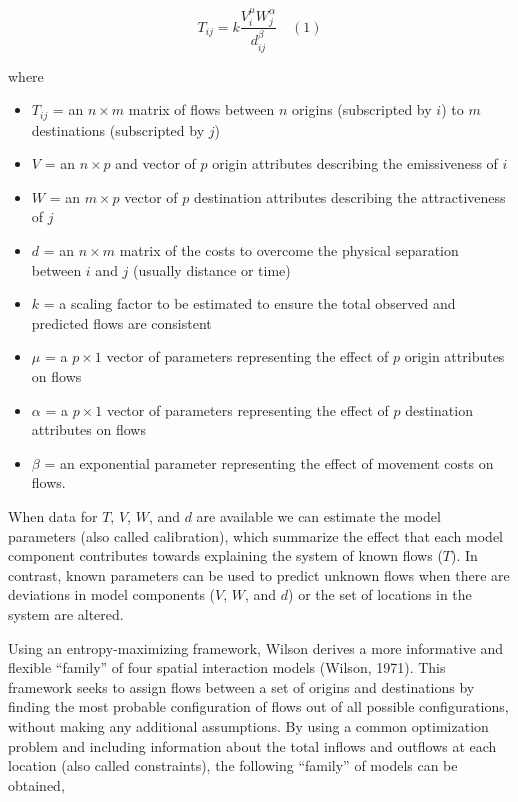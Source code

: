 \documentclass[11pt]{article}
\begin{document}
\[T_{ij} = k\frac{V_{i}^\mu W_{j}^\alpha}{d_{ij}^\beta} \quad(1)\]

where

\begin{itemize}
\item
  \(T_{ij}\) = an \(n \times m\) matrix of flows between \(n\) origins
  (subscripted by \(i\)) to \(m\) destinations (subscripted by \(j\))
\item
  \(V\) = an \(n \times p\) and vector of \(p\) origin attributes
  describing the emissiveness of \(i\)
\item
  \(W\) = an \(m \times p\) vector of \(p\) destination attributes
  describing the attractiveness of \(j\)
\item
  \(d\) = an \(n \times m\) matrix of the costs to overcome the physical
  separation between \(i\) and \(j\) (usually distance or time)
\item
  \(k\) = a scaling factor to be estimated to ensure the total observed
  and predicted flows are consistent
\item
  \(\mu\) = a \(p \times 1\) vector of parameters representing the
  effect of \(p\) origin attributes on flows
\item
  \(\alpha\) = a \(p \times 1\) vector of parameters representing the
  effect of \(p\) destination attributes on flows
\item
  \(\beta\) = an exponential parameter representing the effect of
  movement costs on flows.
\end{itemize}

When data for \(T\), \(V\), \(W\), and \(d\) are available we can
estimate the model parameters (also called calibration), which summarize
the effect that each model component contributes towards explaining the
system of known flows (\(T\)). In contrast, known parameters can be used
to predict unknown flows when there are deviations in model components
(\(V\), \(W\), and \(d\)) or the set of locations in the system are
altered.

Using an entropy-maximizing framework, Wilson derives a more informative
and flexible ``family'' of four spatial interaction models (Wilson,
1971). This framework seeks to assign flows between a set of origins and
destinations by finding the most probable configuration of flows out of
all possible configurations, without making any additional assumptions.
By using a common optimization problem and including information about
the total inflows and outflows at each location (also called
constraints), the following ``family'' of models can be obtained,
\end{document}
